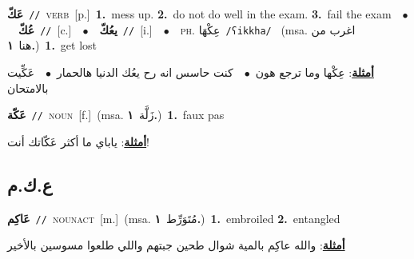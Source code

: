 \documentclass[10pt,a4paper,twoside]{article} %
\begin{document}
\begin{multicols}{2}
{\setlength\topsep{0pt}\textbf{\foreignlanguage{arabic}{عَكّ}}\ {\color{gray}\texttt{//}\color{black}}\ \textsc{verb}\ [p.]\ \textbf{1.}~mess up.  \textbf{2.}~do not do well in the exam.  \textbf{3.}~fail the exam\ \ $\bullet$\ \ \setlength\topsep{0pt}\textbf{\foreignlanguage{arabic}{عُكّ}}\ {\color{gray}\texttt{//}\color{black}}\ [c.]\ \ $\bullet$\ \ \setlength\topsep{0pt}\textbf{\foreignlanguage{arabic}{يعُكّ}}\ {\color{gray}\texttt{//}\color{black}}\ [i.]\ \ $\bullet$\ \ \textsc{ph.} \color{gray} \foreignlanguage{arabic}{عِكْهَا}\color{black}\ {\color{gray}\texttt{/{\sffamily ʕikkha}/}\color{black}}\ \color{gray} (msa. \foreignlanguage{arabic}{اغرب من هنا}~\foreignlanguage{arabic}{\textbf{١.}})\color{black}\ \textbf{1.}~get lost\  \begin{flushright}\color{gray}\foreignlanguage{arabic}{\textbf{\underline{\foreignlanguage{arabic}{أمثلة}}}: عِكْها وما ترجع هون\ $\bullet$\ \  كنت حاسس انه رح يعُك الدنيا هالحمار\ $\bullet$\ \  عَكِّيت بالامتحان}\end{flushright}\color{black}} \vspace{2mm}

{\setlength\topsep{0pt}\textbf{\foreignlanguage{arabic}{عَكّة}}\ {\color{gray}\texttt{//}\color{black}}\ \textsc{noun}\ [f.]\ \color{gray}(msa. \foreignlanguage{arabic}{زَلَّة}~\foreignlanguage{arabic}{\textbf{١.}})\color{black}\ \textbf{1.}~faux pas\  \begin{flushright}\color{gray}\foreignlanguage{arabic}{\textbf{\underline{\foreignlanguage{arabic}{أمثلة}}}: ياباي ما أكثر عَكّاتك أنت!}\end{flushright}\color{black}} \vspace{2mm}

\vspace{-3mm}
\subsection*{\color{blue}\foreignlanguage{arabic}{ع.ك.م}\color{blue}{}} 

{\setlength\topsep{0pt}\textbf{\foreignlanguage{arabic}{عَاكِم}}\ {\color{gray}\texttt{//}\color{black}}\ \textsc{noun\textunderscore act}\ [m.]\ \color{gray}(msa. \foreignlanguage{arabic}{مُتَوَرِّط}~\foreignlanguage{arabic}{\textbf{١.}})\color{black}\ \textbf{1.}~embroiled  \textbf{2.}~entangled\  \begin{flushright}\color{gray}\foreignlanguage{arabic}{\textbf{\underline{\foreignlanguage{arabic}{أمثلة}}}: والله عاكِم بالمية شوال طحين جبتهم واللي طلعوا مسوسين بالأخير}\end{flushright}\color{black}} \vspace{2mm}


\end{multicols}
\end{document}
